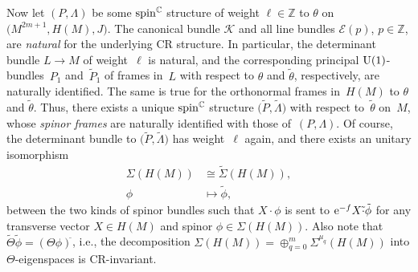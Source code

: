 \documentclass[10pt,a4paper]{amsart}
\numberwithin{equation}{section}
\newcommand{\ZZ}{\mathbb{Z}}
\newcommand{\CC}{\mathbb{C}}
\begin{document}
Now let $(P,\Lambda)$ be some ${\rm spin}^\CC$ structure of weight $\ell\in\ZZ$ to $\theta$ on $\big(M^{2m+1},H(M),J\big)$.
The canonical bundle $\mathcal{K}$ and all line bundles $\mathcal{E}(p)$, $p\in\ZZ$, are {\em natural} for the underlying
CR structure. In particular, the determinant bundle $L\to M$ of weight~$\ell$ is natural, and the corresponding principal ${\rm U}(1)$-bundles~$P_1$ and~$\tilde{P}_1$
of frames in~$L$ with respect to $\theta$ and $\tilde{\theta}$, respectively, are naturally identified.
The same is true for the orthonormal frames in~$H(M)$ to $\theta$ and $\tilde{\theta}$.
Thus, there exists a unique ${\rm spin}^\CC$ structure $\big(\tilde{P},\tilde{\Lambda}\big)$ with respect to~$\tilde{\theta}$
on~$M$, whose {\em spinor frames} are naturally identified with those of~$(P,\Lambda)$.
Of course, the determinant bundle to $\big(\tilde{P},\tilde{\Lambda}\big)$ has weight~$\ell$ again, and there exists
an unitary isomorphism
\begin{align*}
\Sigma(H(M))&\cong \widetilde{\Sigma}(H(M)),\\
\phi&\mapsto \tilde{\phi},
\end{align*}
between the two kinds of spinor bundles such that
$X\cdot\phi$ is sent to ${\rm e}^{-f}X \tilde{\cdot} \tilde{\phi}$ for any transverse vector $X\in H(M)$ and spinor $\phi\in \Sigma(H(M))$.
Also note that $\widetilde{\Theta}\tilde{\phi}=(\Theta\phi)^{\widetilde{}}$, i.e., the decomposition $\Sigma(H(M))=\oplus_{q=0}^m \Sigma^{\mu_q}(H(M))$
into $\Theta$-eigenspaces is CR-invariant.
\end{document}

